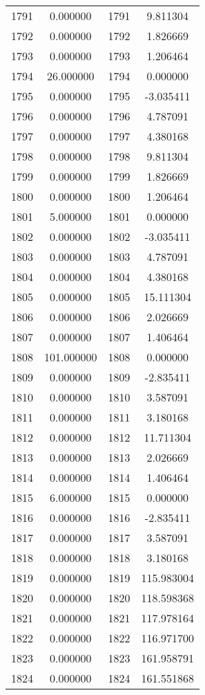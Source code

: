 \documentclass[12pt]{article}
\begin{document}
\begin{longtable}{@{}cccc@{}}
1791 & 0.000000 & 1791 & 9.811304 \\
1792 & 0.000000 & 1792 & 1.826669 \\
1793 & 0.000000 & 1793 & 1.206464 \\
1794 & 26.000000 & 1794 & 0.000000 \\
1795 & 0.000000 & 1795 & -3.035411 \\
1796 & 0.000000 & 1796 & 4.787091 \\
1797 & 0.000000 & 1797 & 4.380168 \\
1798 & 0.000000 & 1798 & 9.811304 \\
1799 & 0.000000 & 1799 & 1.826669 \\
1800 & 0.000000 & 1800 & 1.206464 \\
1801 & 5.000000 & 1801 & 0.000000 \\
1802 & 0.000000 & 1802 & -3.035411 \\
1803 & 0.000000 & 1803 & 4.787091 \\
1804 & 0.000000 & 1804 & 4.380168 \\
1805 & 0.000000 & 1805 & 15.111304 \\
1806 & 0.000000 & 1806 & 2.026669 \\
1807 & 0.000000 & 1807 & 1.406464 \\
1808 & 101.000000 & 1808 & 0.000000 \\
1809 & 0.000000 & 1809 & -2.835411 \\
1810 & 0.000000 & 1810 & 3.587091 \\
1811 & 0.000000 & 1811 & 3.180168 \\
1812 & 0.000000 & 1812 & 11.711304 \\
1813 & 0.000000 & 1813 & 2.026669 \\
1814 & 0.000000 & 1814 & 1.406464 \\
1815 & 6.000000 & 1815 & 0.000000 \\
1816 & 0.000000 & 1816 & -2.835411 \\
1817 & 0.000000 & 1817 & 3.587091 \\
1818 & 0.000000 & 1818 & 3.180168 \\
1819 & 0.000000 & 1819 & 115.983004 \\
1820 & 0.000000 & 1820 & 118.598368 \\
1821 & 0.000000 & 1821 & 117.978164 \\
1822 & 0.000000 & 1822 & 116.971700 \\
1823 & 0.000000 & 1823 & 161.958791 \\
1824 & 0.000000 & 1824 & 161.551868 \\

\end{longtable}
\end{document}
